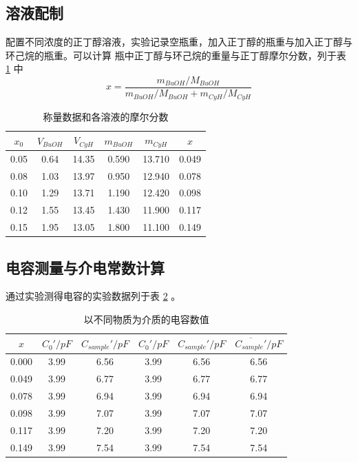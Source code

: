 \documentclass[cn,hazy,pku,12pt,normal,math=newtx,cite=super]{elegantnote}
\begin{document}
\subsection{溶液配制}

配置不同浓度的正丁醇溶液，实验记录空瓶重，加入正丁醇的瓶重与加入正丁醇与环己烷的瓶重。可以计算
瓶中正丁醇与环己烷的重量与正丁醇摩尔分数，列于表 \ref{01} 中
\begin{equation}
 x = \frac{m_{BuOH}/M_{BuOH}}{m_{BuOH}/M_{BuOH}+m_{CyH}/M_{CyH}}    
\end{equation}


\begin{table}[h]
    \centering
    \caption{称量数据和各溶液的摩尔分数}
    \label{01}
    \begin{tabular}{cccccc}
    \hline
    $x_0$ & $V_{BuOH}$ & $V_{CyH}$ & $m_{BuOH}$ & $m_{CyH}$ & $x$   \\ \hline
    0.05  & 0.64       & 14.35     & 0.590      & 13.710    & 0.049 \\
    0.08  & 1.03       & 13.97     & 0.950      & 12.940    & 0.078 \\
    0.10  & 1.29       & 13.71     & 1.190      & 12.420    & 0.098 \\
    0.12  & 1.55       & 13.45     & 1.430      & 11.900    & 0.117 \\
    0.15  & 1.95       & 13.05     & 1.800      & 11.100    & 0.149 \\ \hline
    \end{tabular}
\end{table}


\subsection{电容测量与介电常数计算}

通过实验测得电容的实验数据列于表 \ref{02} 。

\begin{table}[h]
    \centering
    \caption{以不同物质为介质的电容数值}
    \label{02}
    \begin{tabular}{cccccc}
    \hline
    $x$   & $C_0'/pF$ & $C_{sample}'/pF$ & $C_0'/pF$  & $C_{sample}'/pF$ & $\overline{C_{sample}'}/pF$       \\ \hline
    0.000 & 3.99     & 6.56            & 3.99       & 6.56             & 6.56                   \\
    0.049 & 3.99     & 6.77            & 3.99       & 6.77             & 6.77                   \\
    0.078 & 3.99     & 6.94            & 3.99       & 6.94             & 6.94                   \\
    0.098 & 3.99     & 7.07            & 3.99       & 7.07             & 7.07                   \\
    0.117 & 3.99     & 7.20            & 3.99       & 7.20             & 7.20                   \\
    0.149 & 3.99     & 7.54            & 3.99       & 7.54             & 7.54                   \\ \hline
    \end{tabular}       
\end{table}
\end{document}

